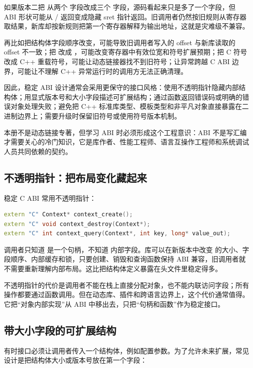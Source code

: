 如果版本二把  从两个  字段改成三个  字段，源码看起来只是多了一个字段，但 ABI 形状可能从 / 返回变成隐藏 sret 指针返回。旧调用者仍然按旧规则从寄存器取结果，新库却按新规则把第一个寄存器解释为输出地址，这就是灾难级不兼容。

再比如把结构体字段顺序改变，可能导致旧调用者写入的 offset 与新库读取的 offset 不一致；把  改成 ，可能改变寄存器中有效位宽和符号扩展预期；把 C 符号改成 C++ 重载符号，可能让动态链接器找不到旧符号；让异常跨越 C ABI 边界，可能让不理解 C++ 异常运行时的调用方无法正确清理。

因此，稳定 ABI 设计通常会采用更保守的接口风格：使用不透明指针隐藏内部结构体；用显式版本号和大小字段描述可扩展结构；通过函数返回错误码或明确的错误对象处理失败；避免把 C++ 标准库类型、模板类型和非平凡对象直接暴露在二进制边界上；需要升级时保留旧符号或使用符号版本机制。

本册不是动态链接专著，但学习 ABI 时必须形成这个工程意识：ABI 不是写汇编才需要关心的冷门知识，它是库作者、性能工程师、语言互操作工程师和系统调试人员共同依赖的契约。

\subsection{不透明指针：把布局变化藏起来}

稳定 C ABI 常用不透明指针：

\begin{lstlisting}[language=C++]
extern "C" Context* context_create();
extern "C" void context_destroy(Context*);
extern "C" int context_query(Context*, int key, long* value_out);
\end{lstlisting}

调用者只知道  是一个句柄，不知道  内部字段。库可以在新版本中改变  的大小、字段顺序、内部缓存和锁，只要创建、销毁和查询函数保持 ABI 兼容，旧调用者就不需要重新理解内部布局。这比把结构体定义暴露在头文件里稳定得多。

不透明指针的代价是调用者不能在栈上直接分配对象，也不能内联访问字段；所有操作都要通过函数调用。但在动态库、插件和跨语言边界上，这个代价通常值得。它把“对象内部实现”从 ABI 中移出去，只把“句柄和函数”作为稳定接口。

\subsection{带大小字段的可扩展结构}

有时接口必须让调用者传入一个结构体，例如配置参数。为了允许未来扩展，常见设计是把结构体大小或版本号放在第一个字段：

